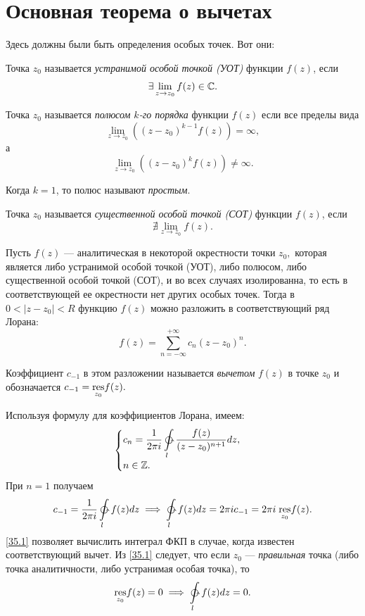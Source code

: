 \documentclass[../../main.tex]{subfiles}
\begin{document}
\section{Основная теорема о вычетах}

	\begin{erem}
	Здесь должны были быть определения особых точек. Вот они:
	
	\begin{defn}
		Точка $z_0$ называется \emph{устранимой особой точкой (УОТ)} функции $f(z)$, 
		если
		\[\exists \lim_{z\to z_0}f(z)\in \mathbb{C}.\]
	\end{defn}

	\begin{defn}
		Точка $z_0$ называется \emph{полюсом $k$-го порядка} функции $f(z)$ если все 
		пределы вида
		\[\lim_{z\to z_0}\left((z - z_0)^{k - 1} f(z)\right) = \infty,\]а
		\[\lim_{z\to z_0}\left((z - z_0)^k f(z)\right) \ne \infty.\]
		
		Когда $k = 1$, то полюс называют \emph{простым}.
	\end{defn}

	\begin{defn}
		Точка $z_0$ называется \emph{существенной особой точкой (СОТ)} функции 
		$f(z)$, если
		\[\nexists \lim_{z\to z_0}f(z).\]
	\end{defn}
	\end{erem}
	
	Пусть $f(z)$ --- аналитическая в некоторой окрестности точки $z_0,$ которая 
	является либо устранимой особой точкой (УОТ),
	либо полюсом, либо существенной особой точкой (СОТ), и во всех случаях 
	изолированна, 
	то есть в соответствующей ее окрестности нет других особых точек. Тогда в $0 
	< |z-z_0| < R$ функцию $f(z)$ можно разложить в соответствующий ряд Лорана:
	\[
		f(z) = \sum_{n=-\infty}^{+\infty}c_n(z-z_0)^n.
	\]
	
	Коэффициент $c_{-1}$ в этом разложении называется \emph{вычетом} $f(z)$ в 
	точке 
	$z_0$ и обозначается 
	$c_{-1} = \underset{z_0}{\operatorname{res}} f(z).$
	
	Используя формулу для коэффициентов Лорана, имеем:
	\[
		\begin{cases}
		\displaystyle
		c_n = \frac{1}{2\pi i} \ointctrclockwise\limits_{l} \frac{f(z)}{(z - 
		z_0)^{n+1}}dz,\\
		n \in \Z.
		\end{cases}
	\]
	При $n = 1$ получаем
	\begin{equation} \label{35.1}
		c_{-1} = \frac{1}{2\pi i} \ointctrclockwise\limits_{l} 
		f(z)dz \implies 
		\ointctrclockwise\limits_{l} f(z)dz = 2\pi i c_{-1} = 2 \pi i\;
		\underset{z_0}{\res} f(z).
	\end{equation}
	\eqref{35.1} позволяет вычислить интеграл ФКП в случае, когда известен 
	соответствующий вычет. Из \eqref{35.1} следует, что если $z_0$ --- 
	\emph{правильная} 
	точка (либо точка аналитичности, либо устранимая особая точка), то 
	\[
		\underset{z_0}{\res}f(z) = 0 \implies 
		\ointctrclockwise\limits_{l} f(z)dz = 0.
	\]
	
\end{document}
